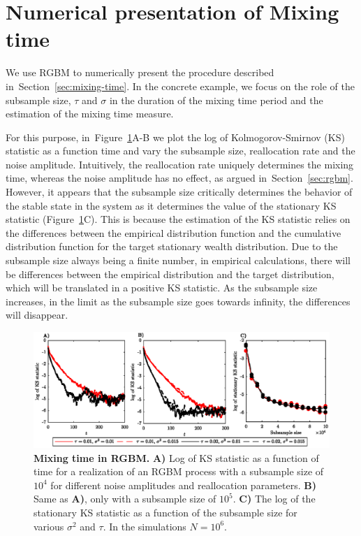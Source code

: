 \documentclass[11pt]{article}
\newcommand{\Sref}[1]{Section~\ref{sec:#1}}
\newcommand{\Fref}[1]{Figure~\ref{fig:#1}}
\numberwithin{equation}{section}
\begin{document}
\section{Numerical presentation of Mixing time}\label{sec:rgbm-numerical-mixing-time}

We use RGBM to numerically present the procedure described in~\Sref{mixing-time}. In the concrete example, we focus on the role of the subsample size, $\tau$ and $\sigma$ in the duration of the mixing time period and the estimation of the mixing time measure. 

For this purpose, in~\Fref{rgbm-mixing-time}A-B we plot the log of Kolmogorov-Smirnov (KS) statistic as a function time and vary the subsample size, reallocation rate and the noise amplitude. Intuitively, the reallocation rate uniquely determines the mixing time, whereas the noise amplitude has no effect, as argued in~\Sref{rgbm}. However, it appears that the subsample size critically determines the behavior of the stable state in the system as it determines the value of the stationary KS statistic (\Fref{rgbm-mixing-time}C). This is because the estimation of the KS statistic relies on the differences between the empirical distribution function and the cumulative distribution function for the target stationary wealth distribution. Due to the subsample size always being a finite number, in empirical calculations, there will be differences between the empirical distribution and the target distribution, which will be translated in a positive KS statistic. As the subsample size increases, in the limit as the subsample size goes towards infinity, the differences will disappear.

\begin{figure}[!htb]
\centering
\includegraphics[width=1.0\textwidth]{figs/fig_mixing_time_rgbm.eps}
\caption{\textbf{Mixing time in RGBM.} \textbf{A)} Log of KS statistic as a function of time for a realization of an RGBM process with a subsample size of $10^4$ for different noise amplitudes and reallocation parameters. \textbf{B)} Same as \textbf{A)}, only with a subsample size of $10^5$. \textbf{C)} The log of the stationary KS statistic as a function of the subsample size for various $\sigma^2$ and $\tau$. In the simulations $N = 10^6$. \label{fig:rgbm-mixing-time}}
\end{figure}
\end{document}
